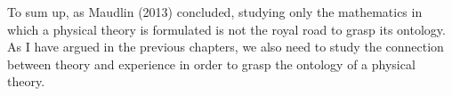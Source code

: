  
To sum up, as Maudlin (2013) concluded, studying only the mathematics in which a physical theory is formulated is not the royal road to grasp its ontology. As I have argued in the previous chapters, we also need to study the connection between theory and experience in order to grasp the ontology of a physical theory.


